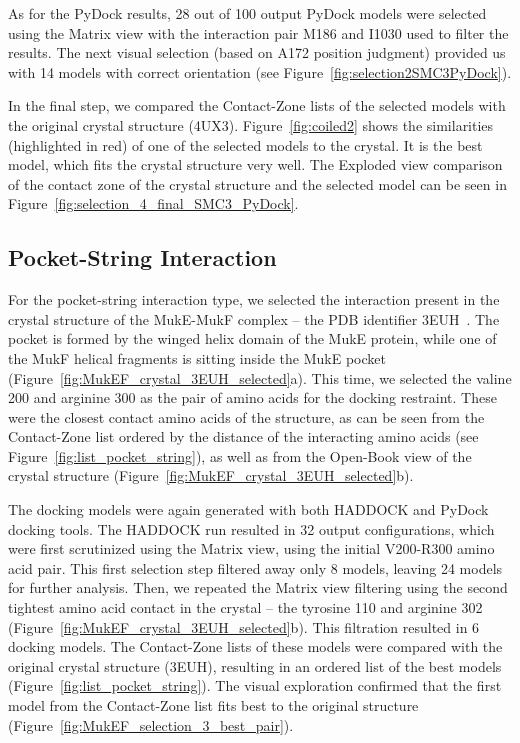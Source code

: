 \documentclass{bmcart}
\def\OpBook {Open-Book view\xspace}
\def\ExpView {Exploded view\xspace}
\def\MatView {Matrix view\xspace}
\def\CoZoList{Contact-Zone list\xspace}
\def\CoZoLists{Contact-Zone lists\xspace}
\begin{document}
As for the PyDock results, 28 out of 100 output PyDock models were selected using the \MatView with the interaction pair M186 and I1030 used to filter the results.
The next visual selection (based on A172 position judgment) provided us with 14 models with correct orientation (see Figure~\ref{fig:selection2SMC3PyDock}).

In the final step, we compared the \CoZoLists of the selected models with the original crystal structure (4UX3). 
Figure~\ref{fig:coiled2} shows the similarities (highlighted in red) of one of the selected models to the crystal. It is the best model, which fits the crystal structure very well. The \ExpView comparison of the contact zone of the crystal structure and the selected model can be seen in Figure~\ref{fig:selection_4_final_SMC3_PyDock}.

\subsection*{Pocket-String Interaction}
For the pocket-string interaction type, we selected the interaction present in the crystal structure of the MukE-MukF complex --  the PDB identifier 3EUH~\cite{Woo}. 
The pocket is formed by the winged helix domain of the MukE protein, while one of the MukF helical fragments is sitting inside the MukE pocket (Figure~\ref{fig:MukEF_crystal_3EUH_selected}a). 
This time, we selected the valine 200 and arginine 300 as the pair of amino acids for the docking restraint. 
These were the closest contact amino acids of the structure, as can be seen from the \CoZoList ordered by the distance of the interacting amino acids (see Figure~\ref{fig:list_pocket_string}), as well as from the \OpBook of the crystal structure (Figure~\ref{fig:MukEF_crystal_3EUH_selected}b). 

The docking models were again generated with both HADDOCK and PyDock docking tools.
The HADDOCK run resulted in 32 output configurations, which were first scrutinized using the \MatView, using the initial V200-R300 amino acid pair. 
This first selection step filtered away only 8 models, leaving 24 models for further analysis. 
Then, we repeated the \MatView filtering using the second tightest amino acid contact in the crystal -- the tyrosine 110 and arginine 302 (Figure~\ref{fig:MukEF_crystal_3EUH_selected}b). 
This filtration resulted in 6 docking models. 
The \CoZoLists of these models were compared with the original crystal structure (3EUH), resulting in an ordered list of the best models (Figure~\ref{fig:list_pocket_string}).
The visual exploration confirmed that the first model from the \CoZoList fits best to the original structure (Figure~\ref{fig:MukEF_selection_3_best_pair}). 
\end{document}
